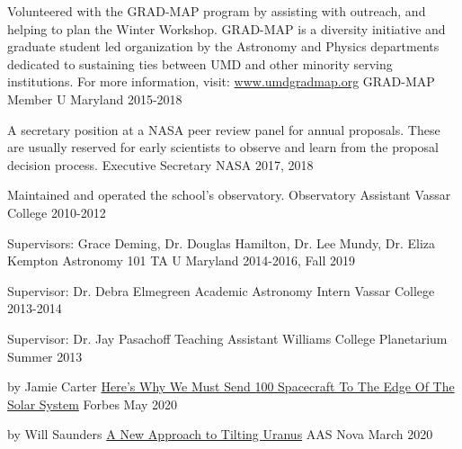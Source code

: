\documentclass[]{awesome-cv}
\begin{document}
\begin{cventries}
	\cventry
	{Volunteered with the GRAD-MAP program by assisting with outreach, and helping to plan the Winter Workshop. GRAD-MAP is a diversity initiative and graduate student led organization by the Astronomy and Physics departments dedicated to sustaining ties between UMD and other minority serving institutions. For more information, visit: \href{https://www.umdgradmap.org/}{www.umdgradmap.org}}
	{GRAD-MAP Member}
	{U Maryland}
	{2015-2018}
	{}
	
	\vspace{-5mm}
	\cventry
	{A secretary position at a NASA peer review panel for annual proposals. These are usually reserved for early scientists to observe and learn from the proposal decision process.}
	{Executive Secretary}
	{NASA}
	{2017, 2018}
	{}
	
	\vspace{-5mm}
	\cventry
	{Maintained and operated the school's observatory.}
	{Observatory Assistant}
	{Vassar College}
	{2010-2012}
	{}
	
	\vspace{-5mm}
\end{cventries}

\begin{cventries}
	\cventry
	{Supervisors: Grace Deming, Dr. Douglas Hamilton, Dr. Lee Mundy, Dr. Eliza Kempton}
	{Astronomy 101 TA}
	{U Maryland}
	{2014-2016, Fall 2019}
	{}
	
	\vspace{-6mm}
	\cventry
	{Supervisor: Dr. Debra Elmegreen}
	{Academic Astronomy Intern}
	{Vassar College}
	{2013-2014}
	{}
	
	\vspace{-6mm}
	\cventry
	{Supervisor: Dr. Jay Pasachoff}
	{Teaching Assistant}
	{Williams College Planetarium}
	{Summer 2013}
	{}
	
	\vspace{-5mm}
\end{cventries}

\begin{cventries}
	\cventry
	{by Jamie Carter}
	{\href{https://tinyurl.com/y9yth6w2}{Here’s Why We Must Send 100 Spacecraft To The Edge Of The Solar System}}
	{Forbes}
	{May 2020}
	{}
	
	\vspace{-5mm}
	\cventry
	{by Will Saunders}
	{\href{https://aasnova.org/2020/03/10/a-new-approach-to-tilting-uranus/}{A New Approach to Tilting Uranus}}
	{AAS Nova}
	{March 2020}
	{}
	
	\vspace{-5mm}
\end{cventries}

%	
\end{document}

